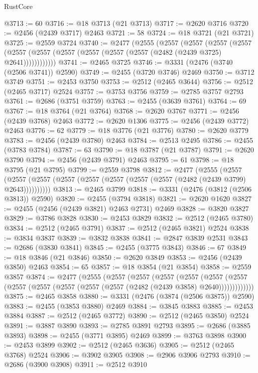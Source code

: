 \begin{lexlean}{RustCore}
\begin{coremodule}
@3713 := 60
@3716 := @18 @3713 (@21 @3713)
@3717 := @2620 @3716
@3720 := @2456 (@2439 @3717) @2463
@3721 := 58
@3724 := @18 @3721 (@21 @3721)
@3725 := @2559 @3724
@3740 := @2477
    (@2555
      (@2557
        (@2557
          (@2557
            (@2557 (@2557 (@2557 (@2557 (@2557 (@2557 (@2557 (@2482 (@2439 @3725) @2641))))))))))))
@3741 := @2465 @3725
@3746 := @3331 (@2476 (@3740 (@2506 @3741)) @2590)
@3749 := @2455 (@3720 @3746) @2469
@3750 := @3712 @3749
@3751 := @2453 @3750
@3753 := @2512 (@2465 @3644)
@3756 := @2512 (@2465 @3717) @2524
@3757 := @3753 @3756
@3759 := @2785 @3757 @2793
@3761 := @2686 (@3751 @3759)
@3763 := @2455 (@3639 @3761)
@3764 := 69
@3767 := @18 @3764 (@21 @3764)
@3768 := @2620 @3767
@3771 := @2456 (@2439 @3768) @2463
@3772 := @2620 @1306
@3775 := @2456 (@2439 @3772) @2463
@3776 := 62
@3779 := @18 @3776 (@21 @3776)
@3780 := @2620 @3779
@3783 := @2456 (@2439 @3780) @2463
@3784 := @2513 @2495
@3786 := @2455 (@3783 @3784)
@3787 := 63
@3790 := @18 @3787 (@21 @3787)
@3791 := @2620 @3790
@3794 := @2456 (@2439 @3791) @2463
@3795 := 61
@3798 := @18 @3795 (@21 @3795)
@3799 := @2559 @3798
@3812 := @2477
    (@2555
      (@2557 (@2557 (@2557 (@2557 (@2557 (@2557 (@2557 (@2557 (@2482 (@2439 @3799) @2643))))))))))
@3813 := @2465 @3799
@3818 := @3331 (@2476 (@3812 (@2506 @3813)) @2590)
@3820 := @2455 (@3794 @3818)
@3821 := @2620 @1620
@3827 := @2455 (@2456 (@2439 @3821) @2463 @2731) @2469
@3828 := @3820 @3827
@3829 := @3786 @3828
@3830 := @2453 @3829
@3832 := @2512 (@2465 @3780)
@3834 := @2512 (@2465 @3791)
@3837 := @2512 (@2465 @3821) @2524
@3838 := @3834 @3837
@3839 := @3832 @3838
@3841 := @2847 @3839 @2531
@3843 := @2686 (@3830 @3841)
@3845 := @2455 (@3775 @3843)
@3846 := 67
@3849 := @18 @3846 (@21 @3846)
@3850 := @2620 @3849
@3853 := @2456 (@2439 @3850) @2463
@3854 := 65
@3857 := @18 @3854 (@21 @3854)
@3858 := @2559 @3857
@3874 := @2477
    (@2555
      (@2557
        (@2557
          (@2557
            (@2557
              (@2557
                (@2557 (@2557 (@2557 (@2557 (@2557 (@2557 (@2482 (@2439 @3858) @2640)))))))))))))
@3875 := @2465 @3858
@3880 := @3331 (@2476 (@3874 (@2506 @3875)) @2590)
@3883 := @2455 (@3853 @3880) @2469
@3884 := @3845 @3883
@3885 := @2453 @3884
@3887 := @2512 (@2465 @3772)
@3890 := @2512 (@2465 @3850) @2524
@3891 := @3887 @3890
@3893 := @2785 @3891 @2793
@3895 := @2686 (@3885 @3893)
@3898 := @2455 (@3771 @3895) @2469
@3899 := @3763 @3898
@3900 := @2453 @3899
@3902 := @2512 (@2465 @3636)
@3905 := @2512 (@2465 @3768) @2524
@3906 := @3902 @3905
@3908 := @2906 @3906 @2793
@3910 := @2686 (@3900 @3908)
@3911 := @2512 @3910

\end{coremodule}
\end{lexlean}
